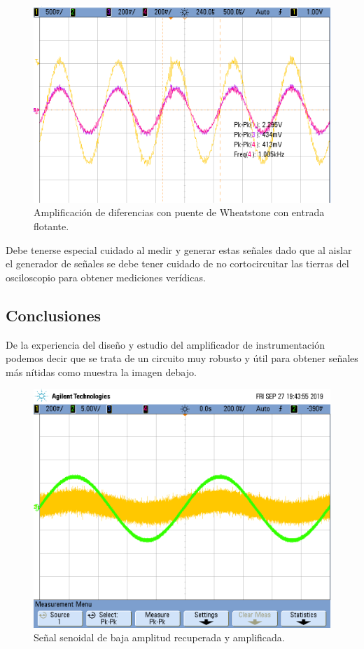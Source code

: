 \begin{figure}[H]
	\centering
	\includegraphics[height=0.3\textheight]{./ImagenesDeOsciloscopio/WheatstoneAislado.png}
	\caption{Amplificación de diferencias con puente de Wheatstone con entrada flotante.}
\end{figure}


Debe tenerse especial cuidado al medir y generar estas señales dado que al aislar el generador de señales se debe tener cuidado de no cortocircuitar las tierras del osciloscopio para obtener mediciones verídicas.

\subsection{Conclusiones}

De la experiencia del diseño y estudio del amplificador de instrumentación podemos decir que se trata de un circuito muy robusto y útil para obtener señales más nítidas como muestra la imagen debajo.

\begin{figure}[H]
	\centering
	\includegraphics[height=0.3\textheight]{./ImagenesDeOsciloscopio/sinfiltrosSeno.png}
	\caption{Señal senoidal de baja amplitud recuperada y amplificada.}
\end{figure}


